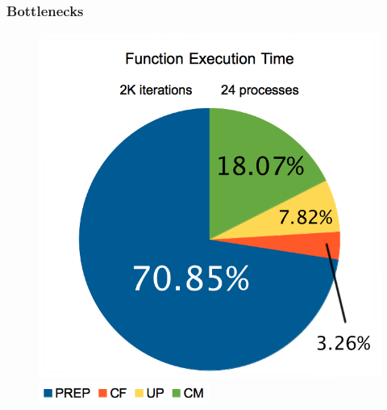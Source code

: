\documentclass{beamer}
\begin{document}
\begin{frame}
	\frametitle{Bottlenecks}
	\begin{figure}
		\begin{center}
			\includegraphics[height=0.75\textheight]{images/may/load24.png}
			
			\includegraphics[width=0.5\textwidth]{images/may/legend.png}
		\end{center}
	\end{figure}
\end{frame}
\end{document}
